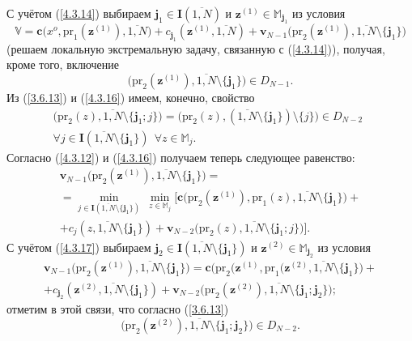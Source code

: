 \documentclass[11pt,twoside]{report}
\newcommand{\bfn}{\begin{equation}}
\newcommand{\efn}{\end{equation}}
\newcommand{\ov}{\overline}
\newcommand{\sm}{\setminus}
\newcommand{\fa}{\forall}
\newcommand{\bbm}{{\mathbb M}}
\begin{document}
{С учётом (\ref{4.3.14}) выбираем $\mathbf{j}_1\in \mathbf{I}(\ov{1,N})$ и
$\mathbf{z}^{(1)}\in \bbm_{\mathbf{j}_1}$ из условия
\bfn\label{4.3.15}
\mathbb{V}= \mathbf{c}\bigl(x^o,\mathrm{pr}_1(\mathbf{z}^{(1)}),\ov{1,N}\bigl) +
c_{\mathbf{j}_1}(\mathbf{z}^{(1)},\ov{1,N}) + \mathbf{v}_{N-1}
\bigl(\mathrm{pr}_2(\mathbf{z}^{(1)}),\ov{1,N}\sm\{\mathbf{j}_1\}\bigl)
\efn
(решаем локальную экстремальную задачу, связанную с (\ref{4.3.14})),
получая, кроме того, включение
\bfn\label{4.3.16}
\bigl(\mathrm{pr}_2(\mathbf{z}^{(1)}),\ov{1,N}\sm\{\mathbf{j}_1\}\bigl)\in D_{N-1}.
\efn
Из (\ref{3.6.13}) и (\ref{4.3.16}) имеем, конечно, свойство
\begin{eqnarray}
&\bigl(\mathrm{pr}_2(z),\ov{1,N}\sm\{\mathbf{j}_1;j\}\bigl) =
\bigl(\mathrm{pr}_2(z),(\ov{1,N}\sm
\{\mathbf{j}_1\})\sm\{j\}\bigl)\in D_{N-2}\ \
&\nonumber\\
&\fa j\in
\mathbf{I}(\ov{1,N}\sm\{\mathbf{j}_1\})\
\ \fa z\in \bbm_j.
\end{eqnarray}
Согласно (\ref{4.3.12}) и (\ref{4.3.16}) получаем теперь следующее равенство:
\begin{eqnarray}
&\mathbf{v}_{N-1}\bigl(\mathrm{pr}_2(\mathbf{z}^{(1)}),\ov{1,N}\sm\{\mathbf{j}_1\}
\bigl)=
&\nonumber\\
&=\min\limits_{j\in\mathbf{I}(\ov{1,N}\sm\{\mathbf{j}_1\})}\
\min\limits_{z\in\bbm_j}\bigl[\mathbf{c}\bigl(\mathrm{pr}_2(\mathbf{z}^{(1)}),\mathrm{pr}_1(z),
\ov{1,N}\sm \{\mathbf{j}_1\}\bigl) +
&\nonumber\\
&+ c_j(z,\ov{1,N}\sm\{\mathbf{j}_1\}) +
\mathbf{v}_{N-2}\bigl(\mathrm{pr}_2(z),\ov{1,N}\sm\{\mathbf{j}_1;j\}\bigl)\bigl].
&\label{4.3.17}
\end{eqnarray}
С учётом (\ref{4.3.17}) выбираем $\mathbf{j}_2\in \mathbf{I}(\ov{1,N}\sm
\{\mathbf{j}_1\})$ и $\mathbf{z}^{(2)}\in \bbm_{\mathbf{j}_2}$ из условия
\begin{eqnarray}
&\mathbf{v}_{N-1}\bigl(\mathrm{pr}_2(\mathbf{z}^{(1)}),\ov{1,N}\sm\{\mathbf{j}_1\}
\bigl) = \mathbf{c}\bigl(\mathrm{pr}_2(\mathbf{z}^{(1)}, \mathrm{pr}_1(\mathbf{z}^{(2)},\ov{1,N}\sm
\{\mathbf{j}_1\}\bigl) +
&\nonumber\\
&+ c_{\mathbf{j}_2}(\mathbf{z}^{(2)}, \ov{1,N}\sm\{\mathbf{j}_1\}) +
\mathbf{v}_{N-2}\bigl(\mathrm{pr}_2(\mathbf{z}^{(2)}),\ov{1,N}\sm\{\mathbf{j}_1;\mathbf{j}_2\}\bigl);
&\label{4.3.18}
\end{eqnarray}
отметим в этой связи, что согласно (\ref{3.6.13})
$$\bigl(\mathrm{pr}_2(\mathbf{z}^{(2)}),\ov{1,N}\sm\{\mathbf{j}_1;\mathbf{j}_2\}\bigl)\in D_{N-2}.
$$}
\end{document}
